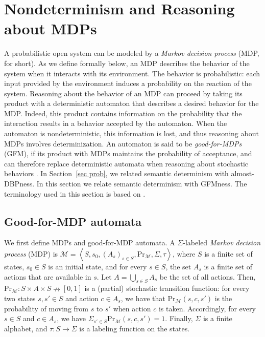 \documentclass[10pt,a4paper]{amsart}
\theoremstyle{definition}
\numberwithin{equation}{section}
\newcommand{\M}{{\mathcal M}}
\newcommand{\zug}[1]{\left\langle #1 \right\rangle}
\renewcommand{\Pr}{\mathrm{Pr}}
\begin{document}
\section{Nondeterminism and Reasoning about MDPs}

A probabilistic open system can be modeled by a \emph{Markov decision process} (MDP, for short). As we define formally below, an MDP describes the behavior of the system when it interacts with its environment. The behavior is probabilistic: each input provided by the environment induces a probability on the reaction of the system. Reasoning about the behavior of an MDP can proceed by taking its product with a deterministic automaton that describes a desired behavior for the MDP. 
Indeed, this product contains information on the probability that the interaction results in a behavior accepted by the automaton. When the automaton is nondeterministic, this information is lost, and thus reasoning about MDPs involves determinization. An automaton is said to be {\em good-for-MDPs} (GFM), if its product with MDPs maintains the probability of acceptance, and can therefore replace deterministic automata when reasoning about stochastic behaviors \cite{HPSSTWW20,STZ22}. In Section~\ref{sec prob}, we related semantic determinism with almost-DBPness. 
In this section we relate semantic determinism with GFMness. 
The terminology used in this section is based on \cite{HPSSTWW20}.

\subsection{Good-for-MDP automata}

We first define MDPs and good-for-MDP automata. 
A $\Sigma$-labeled \emph{Markov decision process} (MDP) is $\M =\zug{S,s_0,(A_s)_{s\in S},\Pr_{\M},\Sigma,\tau}$, where $S$ is a finite set of states, $s_0\in S$ is an initial state, and for every $s\in S$, the set $A_s$ is a finite set of actions that are available in $s$. Let $A=\bigcup_{s\in S}A_s$ be the set of all actions. Then, $\Pr_\M:S\times A\times S\nrightarrow [0,1]$ is a (partial) stochastic transition function: for every two states $s,s'\in S$ and action $c\in A_s$, we have that $\Pr_\M(s,c,s')$ is the probability of moving from $s$ to $s'$ when action $c$ is taken. Accordingly, for every $s\in S$ and $c\in A_s$, we have $\Sigma_{s'\in S}\Pr_\M(s,c,s') = 1$. Finally, $\Sigma$ is a finite alphabet, and $\tau:S\rightarrow \Sigma$ is a labeling function on the states. 
\end{document}

